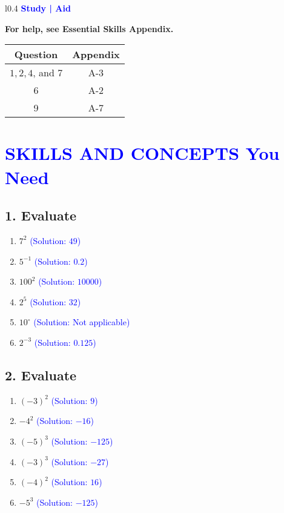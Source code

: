 \documentclass{article}
\begin{document}
\fontsize{10}{20}\selectfont

\begin{wraptable}{l}{0.4\textwidth}
        \textbf{\textcolor{blue}{Study | Aid}}
    
\textbf{For help, see Essential Skills Appendix.}
    
    \begin{tabular}{|c|c|}
        \hline
        \textbf{Question} & \textbf{Appendix} \\
        \hline
        $1,2,4$, and 7 & A-3 \\
        6 & A-2 \\
        9 & A-7 \\
        \hline
    \end{tabular}
\end{wraptable}

\section*{\textcolor{blue}{SKILLS AND CONCEPTS You Need}}

\subsection*{1. Evaluate}

\begin{enumerate}[label=\textbf{\arabic*.}, align=left, left=0pt, itemsep=5pt]
    \item $7^2$ \textcolor{blue}{(Solution: $49$)}
    \item $5^{-1}$ \textcolor{blue}{(Solution: $0.2$)}
    \item $100^2$ \textcolor{blue}{(Solution: $10000$)}
    \item $2^5$ \textcolor{blue}{(Solution: $32$)}
    \item $10^{\circ}$ \textcolor{blue}{(Solution: Not applicable)}
    \item $2^{-3}$ \textcolor{blue}{(Solution: $0.125$)}
\end{enumerate}

\subsection*{2. Evaluate}

\begin{enumerate}[label=\textbf{\arabic*.}, align=left, left=0pt, itemsep=5pt]
    \item $(-3)^2$ \textcolor{blue}{(Solution: $9$)}
    \item $-4^2$ \textcolor{blue}{(Solution: $-16$)}
    \item $(-5)^3$ \textcolor{blue}{(Solution: $-125$)}
    \item $(-3)^3$ \textcolor{blue}{(Solution: $-27$)}
    \item $(-4)^2$ \textcolor{blue}{(Solution: $16$)}
    \item $-5^3$ \textcolor{blue}{(Solution: $-125$)}
\end{enumerate}
\end{document}
